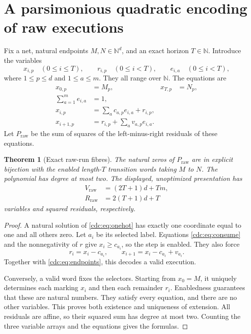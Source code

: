 \documentclass[11pt,a4paper]{article}
\newtheorem{theorem}{Theorem}[section]
\theoremstyle{definition}
\theoremstyle{remark}
\newcommand{\N}{\mathbb N}
\newcommand{\srctag}[1]{\texorpdfstring{\hspace{0.5em}{\normalfont\small\color{accent}[#1]}}{ [#1]}}
\begin{document}
\section{A parsimonious quadratic encoding of raw executions\srctag{05}}
\label{cdc:sec:raw}
Fix a net, natural endpoints $M,N\in\N^d$, and an exact horizon $T\in\N$. Introduce the variables
\[
x_{i,p}\quad(0\le i\le T),\qquad
r_{i,p}\quad(0\le i<T),\qquad
e_{i,a}\quad(0\le i<T),
\]
where $1\le p\le d$ and $1\le a\le m$. They all range over $\N$. The equations are
\begin{align}
x_{0,p}&=M_p,&x_{T,p}&=N_p,\label{cdc:eq:endpoints}\\
\sum_{a=1}^m e_{i,a}&=1,\label{cdc:eq:onehot}\\
x_{i,p}&=\sum_a c_{a,p}e_{i,a}+r_{i,p},\label{cdc:eq:consume}\\
x_{i+1,p}&=r_{i,p}+\sum_a v_{a,p}e_{i,a}.\label{cdc:eq:produce}
\end{align}
Let $P_{\mathrm{raw}}$ be the sum of squares of the left-minus-right residuals of these equations.

\begin{theorem}[Exact raw-run fibres]\label{cdc:thm:raw}
The natural zeros of $P_{\mathrm{raw}}$ are in explicit bijection with the enabled length-$T$ transition words taking $M$ to $N$. The polynomial has degree at most two. The displayed, unoptimized presentation has
\begin{align*}
V_{\mathrm{raw}}&=(2T+1)d+Tm,\\
R_{\mathrm{raw}}&=2(T+1)d+T
\end{align*}
variables and squared residuals, respectively.
\end{theorem}
\begin{proof}
A natural solution of \eqref{cdc:eq:onehot} has exactly one coordinate equal to one and all others zero. Let $a_i$ be its selected label. Equations \eqref{cdc:eq:consume} and the nonnegativity of $r$ give $x_i\ge c_{a_i}$, so the step is enabled. They also force
\[
r_i=x_i-c_{a_i},\qquad x_{i+1}=x_i-c_{a_i}+v_{a_i}.
\]
Together with \eqref{cdc:eq:endpoints}, this decodes a valid execution.

Conversely, a valid word fixes the selectors. Starting from $x_0=M$, it uniquely determines each marking $x_i$ and then each remainder $r_i$. Enabledness guarantees that these are natural numbers. They satisfy every equation, and there are no other variables. This proves both existence and uniqueness of extension. All residuals are affine, so their squared sum has degree at most two. Counting the three variable arrays and the equations gives the formulas.
\end{proof}
\end{document}
